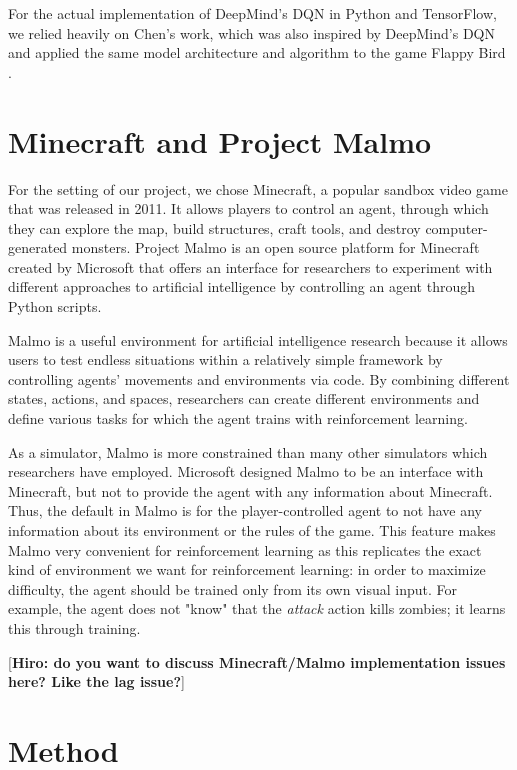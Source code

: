 \documentclass{article}
\begin{document}
\begin{multicols}{2}
For the actual implementation of DeepMind's DQN in Python and TensorFlow, we relied heavily on Chen's work, which was also inspired by DeepMind's DQN and applied the same model architecture and algorithm to the game Flappy Bird \cite{flappyBird}.




\section{Minecraft and Project Malmo}

For the setting of our project, we chose Minecraft, a popular sandbox video game that was released in 2011. It allows players to control an agent, through which they can explore the map, build structures, craft tools, and destroy computer-generated monsters.
Project Malmo is an open source platform for Minecraft created by Microsoft that offers an interface for researchers to experiment with different approaches to artificial intelligence by controlling an agent through Python scripts.

Malmo is a useful environment for artificial intelligence research because it allows users to test endless situations within a relatively simple framework by  controlling agents' movements and environments via code.
By combining different states, actions, and spaces, researchers can create different environments and define various tasks for which the agent trains with reinforcement learning.

As a simulator, Malmo is more constrained than many other simulators which researchers have employed. Microsoft designed Malmo to be an interface with Minecraft, but not to provide the agent with any information about Minecraft.
Thus, the default in Malmo is for the player-controlled agent to not have any information about its environment or the rules of the game.
This feature makes Malmo very convenient for reinforcement learning as this replicates the exact kind of environment we want for reinforcement learning: in order to maximize difficulty, the agent should be trained only from its own visual input.
For example, the agent does not "know" that the \emph{attack} action kills zombies; it learns this through training.

[{\bf Hiro: do you want to discuss Minecraft/Malmo implementation issues here? Like the lag issue?}]




\section{Method}




\end{multicols}
\end{document}
